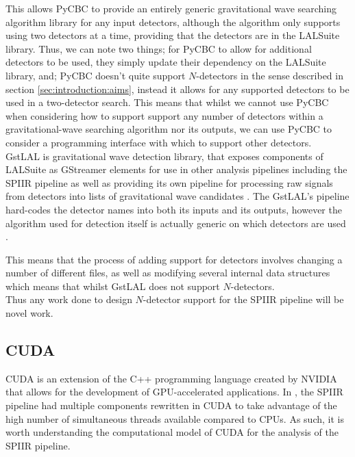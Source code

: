 \documentclass{article}
\begin{document}
This allows PyCBC to provide an entirely generic gravitational wave searching algorithm library for any input detectors, although the algorithm only supports using two detectors at a time, providing that the detectors are in the LALSuite library.
Thus, we can note two things; for PyCBC to allow for additional detectors to be used, they simply update their dependency on the LALSuite library, and; PyCBC doesn't quite support \(N\)-detectors in the sense described in section \ref{sec:introduction:aims}, instead it allows for any supported detectors to be used in a two-detector search.
This means that whilst we cannot use PyCBC when considering how to support support any number of detectors within a gravitational-wave searching algorithm nor its outputs, we can use PyCBC to consider a programming interface with which to support other detectors.
\\

GstLAL is gravitational wave detection library, that exposes components of LALSuite \cite{lalsuite} as GStreamer elements for use in other analysis pipelines \textemdash{} including the SPIIR pipeline \textemdash{} as well as providing its own pipeline for processing raw signals from detectors into lists of gravitational wave candidates \cite{gstlal_docs}.
The GstLAL's pipeline hard-codes the detector names into both its inputs and its outputs, however the algorithm used for detection itself is actually generic on which detectors are used \cite{gstlal_paper, gstlal_coinc}.

This means that the process of adding support for detectors involves changing a number of different files, as well as modifying several internal data structures \cite{messick} \textemdash{} which means that whilst GstLAL does not support \(N\)-detectors.
\\

Thus any work done to design \(N\)-detector support for the SPIIR pipeline will be novel work.

\subsection{CUDA} \label{sec:lit_review:cuda}

CUDA \cite{CUDA} is an extension of the C++ programming language created by NVIDIA that allows for the development of GPU-accelerated applications.
In \cite{SPIIRGPU2018}, the SPIIR pipeline had multiple components rewritten in CUDA to take advantage of the high number of simultaneous threads available compared to CPUs.
As such, it is worth understanding the computational model of CUDA for the analysis of the SPIIR pipeline.
\end{document}

